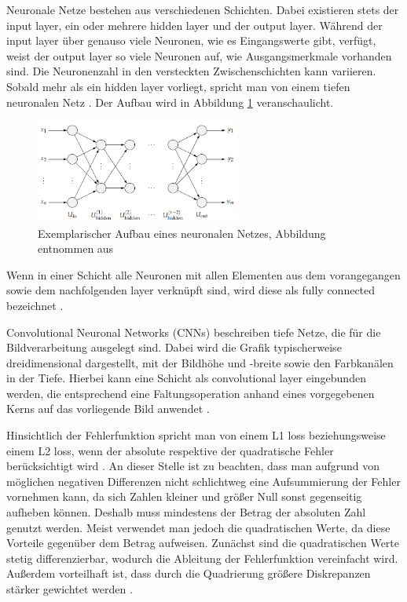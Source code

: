 \documentclass[12pt,a4paper]{article}
\begin{document}
Neuronale Netze bestehen aus verschiedenen Schichten. Dabei existieren stets der input layer, ein oder mehrere hidden layer und der output layer. Während der input layer über genauso viele Neuronen, wie es Eingangswerte gibt, verfügt, weist der output layer so viele Neuronen auf, wie Ausgangsmerkmale vorhanden sind. Die Neuronenzahl in den versteckten Zwischenschichten kann variieren. Sobald mehr als ein hidden layer vorliegt, spricht man von einem tiefen neuronalen Netz \cite[S. 77]{Sewak2019}. Der Aufbau wird in Abbildung \ref{fig:aufbau_nn} veranschaulicht.

\begin{figure}
\centering
\includegraphics[width=0.6\textwidth]{pics/Aufbau_NN.png}	
\caption{Exemplarischer Aufbau eines neuronalen Netzes, Abbildung entnommen aus \cite[S. 44]{Kruse2015}}
\label{fig:aufbau_nn}
\end{figure}

Wenn in einer Schicht alle Neuronen mit allen Elementen aus dem vorangegangen sowie dem nachfolgenden layer verknüpft sind, wird diese als \glqq{}fully connected\grqq{} bezeichnet \cite[S. 79]{Sewak2019}.

Convolutional Neuronal Networks (CNNs) beschreiben tiefe Netze, die für die Bildverarbeitung ausgelegt sind. Dabei wird die Grafik typischerweise dreidimensional dargestellt, mit der Bildhöhe und -breite sowie den Farbkanälen in der Tiefe. Hierbei kann eine Schicht als convolutional layer eingebunden werden, die entsprechend eine Faltungsoperation anhand eines vorgegebenen Kerns auf das vorliegende Bild anwendet \cite[S. 85]{Sewak2019}.

Hinsichtlich der Fehlerfunktion spricht man von einem \glqq{}L1 loss\grqq{} beziehungsweise einem \glqq{}L2 loss\grqq{}, wenn der absolute respektive der quadratische Fehler berücksichtigt wird \cite[S. 82]{Sewak2019}. An dieser Stelle ist zu beachten, dass man aufgrund von möglichen negativen Differenzen nicht schlichtweg eine Aufsummierung der Fehler vornehmen kann, da sich Zahlen kleiner und größer Null sonst gegenseitig aufheben können. Deshalb muss mindestens der Betrag der absoluten Zahl genutzt werden. Meist verwendet man jedoch die quadratischen Werte, da diese Vorteile gegenüber dem Betrag aufweisen. Zunächst sind die quadratischen Werte stetig differenzierbar, wodurch die Ableitung der Fehlerfunktion vereinfacht wird. Außerdem vorteilhaft ist, dass durch die Quadrierung größere Diskrepanzen stärker gewichtet werden \cite[S. 41]{Kruse2015}.
\end{document}
